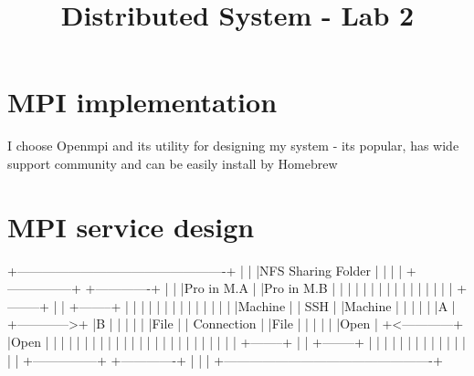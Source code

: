 \documentclass{article}
\title{Distributed System - Lab 2}
\begin{document}
\maketitle
\section{MPI implementation}
I choose Openmpi and its utility for designing my system - its popular, has wide support community and can be easily install by Homebrew

\section{MPI service design}
+-------------------------------------------------+
|                                                 |
|NFS Sharing Folder                               |
|                                                 |
|  +---------------+             +-------------+  |
|  |Pro in M.A     |             |Pro in M.B   |  |
|  |               |             |             |  |
|  |               |             |             |  |
|  |  +--------+   |             | +--------+  |  |
|  |  |        |   |             | |        |  |  |
|  |  |Machine |   |   SSH       | |Machine |  |  |
|  |  |A       |   +------------>+ |B       |  |  |
|  |  |File    |   | Connection  | |File    |  |  |
|  |  |Open    |   +<------------+ |Open    |  |  |
|  |  |        |   |             | |        |  |  |
|  |  |        |   |             | |        |  |  |
|  |  +--------+   |             | +--------+  |  |
|  |               |             |             |  |
|  |               |             |             |  |
|  +---------------+             +-------------+  |
|                                                 |
+-------------------------------------------------+
\end{document}

